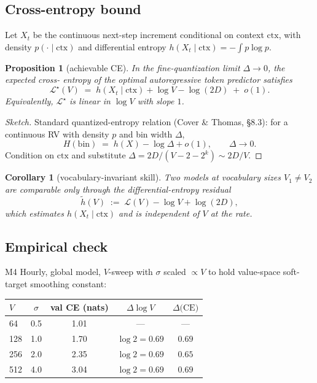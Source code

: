 \documentclass[11pt]{article}
\newtheorem{proposition}[theorem]{Proposition}
\newtheorem{corollary}[theorem]{Corollary}
\theoremstyle{remark}
\begin{document}
\subsection{Cross-entropy bound}

Let $X_t$ be the continuous next-step increment conditional on context
$\mathrm{ctx}$, with density $p(\cdot \mid \mathrm{ctx})$ and differential
entropy $h(X_t \mid \mathrm{ctx}) = -\int p \log p$.

\begin{proposition}[achievable CE]
\label{prop:ce}
In the fine-quantization limit $\Delta \to 0$, the expected cross-
entropy of the optimal autoregressive token predictor satisfies
\begin{equation}
\mathcal{L}^\star(V) \;=\; h(X_t \mid \mathrm{ctx}) + \log V - \log(2D) \;+\; o(1).
\end{equation}
Equivalently, $\mathcal L^\star$ is linear in $\log V$ with slope $1$.
\end{proposition}

\begin{proof}[Sketch]
Standard quantized-entropy relation (Cover \& Thomas, \S 8.3): for a
continuous RV with density $p$ and bin width $\Delta$,
\begin{equation}
H(\mathrm{bin}) \;=\; h(X) - \log \Delta + o(1), \qquad \Delta \to 0.
\end{equation}
Condition on $\mathrm{ctx}$ and substitute $\Delta = 2D/(V - 2 - 2^k)
\sim 2D/V$.
\end{proof}

\begin{corollary}[vocabulary-invariant skill]
\label{cor:skill}
Two models at vocabulary sizes $V_1 \neq V_2$ are comparable only
through the \emph{differential-entropy residual}
\begin{equation}
\tilde h(V) \;:=\; \mathcal L(V) - \log V + \log(2D),
\end{equation}
which estimates $h(X_t \mid \mathrm{ctx})$ and is independent of $V$ at
the rate.
\end{corollary}

\subsection{Empirical check}

M4 Hourly, global model, $V$-sweep with $\sigma$ scaled $\propto V$ to
hold value-space soft-target smoothing constant:

\begin{center}
\begin{tabular}{lcccc}
\toprule
$V$ & $\sigma$ & val CE (nats) & $\Delta \log V$ & $\Delta \text{(CE)}$ \\
\midrule
64   & 0.5 & 1.01 & --- & --- \\
128  & 1.0 & 1.70 & $\log 2 = 0.69$ & $0.69$ \\
256  & 2.0 & 2.35 & $\log 2 = 0.69$ & $0.65$ \\
512  & 4.0 & 3.04 & $\log 2 = 0.69$ & $0.69$ \\
\bottomrule
\end{tabular}
\end{center}
\end{document}
